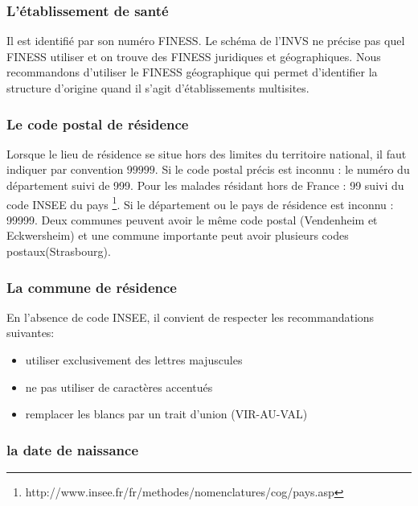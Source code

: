 \documentclass[12pt,english,french,twoside]{book}\usepackage[]{graphicx}\usepackage[]{color}
\begin{document}
\subsubsection{L'établissement de santé}

Il est identifié par son numéro FINESS. Le schéma de l'INVS ne précise pas quel FINESS utiliser et on trouve des FINESS juridiques et géographiques. Nous recommandons d'utiliser le FINESS géographique qui permet d'identifier la structure d'origine quand il s'agit d'établissements multisites.

\subsubsection{Le code postal de résidence}

Lorsque le lieu de résidence se situe hors des limites du territoire national, il faut indiquer par convention $99999$.
Si le code postal précis est inconnu : le numéro du département suivi de 999.
Pour les malades résidant hors de France : 99 suivi du code INSEE du pays \footnote{http://www.insee.fr/fr/methodes/nomenclatures/cog/pays.asp}.
Si le département ou le pays de résidence est inconnu : 99999.
Deux communes peuvent avoir le même code postal (Vendenheim et Eckwersheim) et une commune importante peut avoir plusieurs codes postaux(Strasbourg).

\subsubsection{La commune de résidence}

En l'absence de code INSEE, il convient de respecter les recommandations suivantes:
\begin{itemize}
  \item utiliser exclusivement des lettres majuscules
  \item ne pas utiliser de caractères accentués
  \item remplacer les blancs par un trait d'union (VIR-AU-VAL)
\end{itemize}

\subsubsection{la date de naissance}
\end{document}

